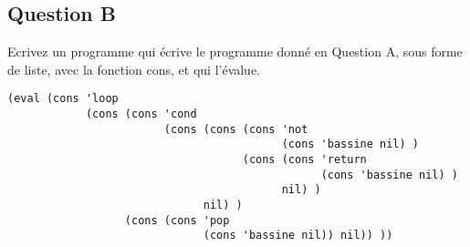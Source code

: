\documentclass[a4paper, 11pt]{article}
\begin{document}
\subsection{Question B}
Ecrivez un programme qui écrive le programme donné en Question A, sous forme de liste, avec la fonction cons, et qui l'évalue.
\begin{lstlisting}
(eval (cons 'loop
            (cons (cons 'cond
                        (cons (cons (cons 'not
                                          (cons 'bassine nil) )
                                    (cons (cons 'return
                                                (cons 'bassine nil) )
                                          nil) )
                              nil) )
                  (cons (cons 'pop
                              (cons 'bassine nil)) nil)) ))
\end{lstlisting}
%
\end{document}
